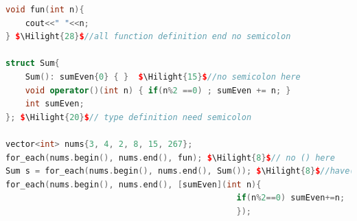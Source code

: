 \documentclass[a4paper,12pt,twoside]{book}
\newcommand{\Hilight}[1]{\makebox[0pt][l]{\color{yellow}\rule[-3pt]{#1em}{11pt}}}
\begin{document}
\begin{lstlisting}[frame=single, language=c++, mathescape=true]
void fun(int n){
    cout<<" "<<n;
} $\Hilight{28}$//all function definition end no semicolon

struct Sum{
    Sum(): sumEven{0} { }  $\Hilight{15}$//no semicolon here
    void operator()(int n) { if(n%2 ==0) ; sumEven += n; }
    int sumEven;
}; $\Hilight{20}$// type definition need semicolon

vector<int> nums{3, 4, 2, 8, 15, 267};
for_each(nums.begin(), nums.end(), fun); $\Hilight{8}$// no () here
Sum s = for_each(nums.begin(), nums.end(), Sum()); $\Hilight{8}$//have() here
for_each(nums.begin(), nums.end(), [sumEven](int n){
                                               if(n%2==0) sumEven+=n;
                                               });
\end{lstlisting}
\end{document}
